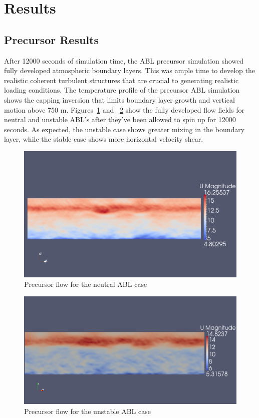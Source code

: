 \section{Results}

\subsection{Precursor Results}
After 12000 seconds of simulation time, the ABL precursor simulation showed fully developed atmospheric boundary layers.  This was ample time to develop the realistic coherent turbulent structures that are crucial to generating realistic loading conditions.  The temperature profile of the precursor ABL simulation shows the capping inversion that limits boundary layer growth and vertical motion above 750 m.  Figures~\ref{fig:neutralABLPrecursorVelocity} and ~\ref{fig:unstableABLvelProfile} show the fully developed flow fields for neutral and unstable ABL's after they've been allowed to spin up for 12000 seconds.  As expected, the unstable case shows greater mixing in the boundary layer, while the stable case shows more horizontal velocity shear.

\begin{figure}
\centering
\includegraphics[width=\textwidth]{images/neutralABLPrecursorVelocity}
\caption{Precursor flow for the neutral ABL case}
\label{fig:neutralABLPrecursorVelocity}
\end{figure}

\begin{figure}
\centering
\includegraphics[width=\textwidth]{images/unstableABLvelProfile}
\caption{Precursor flow for the unstable ABL case}
\label{fig:unstableABLvelProfile}
\end{figure}

